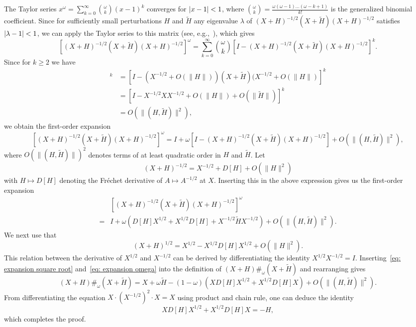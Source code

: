\documentclass[a4paper]{article}
\DeclarePairedDelimiter{\abs}{\lvert}{\rvert}
\theoremstyle{definition}
\numberwithin{equation}{section}
\begin{document}
The Taylor series $x^\omega = \sum_{k=0}^\infty \binom{\omega}{k}(x-1)^k$ converges for $\abs{x-1} < 1$, where $\binom{\omega}{k} = \frac{\omega (\omega - 1) \dots (\omega - k + 1)}{k!}$ is the generalized binomial coefficient. Since for sufficiently small perturbations $H$ and $\tilde H$ any eigenvalue $\lambda$ of $(X + H)^{-1/2}(X+\tilde H)(X+H)^{-1/2}$ satisfies $\abs{ \lambda - 1} < 1$, we can apply the Taylor series to this matrix (see, e.g.,~\cite[Theorem~4.7]{Higham2008}), which gives
\[
 [(X + H)^{-1/2}(X+\tilde H)(X+H)^{-1/2}]^\omega = \sum_{k=0}^\infty \binom{\omega}{k}[ I - (X + H)^{-1/2}(X+\tilde H)(X+H)^{-1/2} ]^k.
\]
Since for $k \ge 2$ we have
\begin{align*}
 [I - (X + H)^{-1/2}(X+\tilde H)(X+H)^{-1/2}]^k &= [I - (X^{-1/2} + O(\|H\|))(X+\tilde H)(X^{-1/2}+O(\|H\|)]^k \\ &= [I - X^{-1/2} X X^{-1/2} + O(\| H \|) + O(\| \tilde H \|) ]^k \\ &= O(\| (H,\tilde H) \|^2),
\end{align*}
we obtain the first-order expansion 
\[
 [(X + H)^{-1/2}(X+\tilde H)(X+H)^{-1/2}]^\omega = I + \omega [I - (X + H)^{-1/2}(X+\tilde H)(X+H)^{-1/2}] + O(\| (H,\tilde H) \|^2),
\]
where $O(\|(H,\tilde H)\|)^2$ denotes terms of at least quadratic order in $H$ and $\tilde H$. Let
\[
 (X+H)^{-1/2} = X^{-1/2} + D[H] + O(\| H \|^2)
\]
with $H \mapsto D[H]$ denoting the Fr\'echet derivative of $A \mapsto A^{-1/2}$ at $X$. Inserting this in the above expression gives us the first-order expansion
\begin{equation}\label{eq: expansion omega}
\begin{aligned}
 &[(X + H)^{-1/2}(X+\tilde H)(X+H)^{-1/2}]^\omega \\
 {}={} &I + \omega (D[H] X^{1/2} + X^{1/2} D[H] + X^{-1/2}\tilde H X^{-1/2}) + O(\| (H,\tilde H) \|^2).
\end{aligned}
\end{equation}
We next use that
\begin{equation}\label{eq: expansion square root}
 (X + H)^{1/2} = X^{1/2} - X^{1/2} D[H] X^{1/2} + O(\| H \|^2).
\end{equation}
This relation between the derivative of $X^{1/2}$ and $X^{-1/2}$ can be derived by differentiating the identity $X^{1/2} X^{-1/2} = I$. Inserting~\eqref{eq: expansion square root} and~\eqref{eq: expansion omega} into the definition of $(X+H)\#_{\omega} (X+\tilde H)$ and rearranging gives
\[
 (X+H)\#_{\omega} (X+\tilde H) = X + \omega \tilde H - (1-\omega)(X D[H] X^{1/2} + X^{1/2}D[H]X) + O(\| (H,\tilde H) \|^2).
\]
From differentiating the equation $X \cdot (X^{-1/2})^2 \cdot X = X$ using product and chain rule, one can deduce the identity
\[
 X D[H] X^{1/2} + X^{1/2}D[H]X = - H, 
\]
which completes the proof. 
\end{document}
